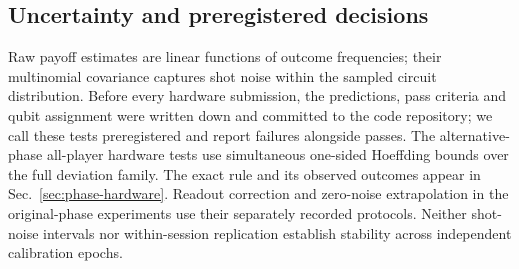 \subsection{Uncertainty and preregistered decisions}
Raw payoff estimates are linear functions of outcome frequencies; their
multinomial covariance captures shot noise within the sampled circuit
distribution. Before every hardware submission, the predictions, pass
criteria and qubit assignment were written down and committed to the code
repository; we call these tests preregistered and report failures alongside
passes. The alternative-phase all-player hardware tests use simultaneous
one-sided Hoeffding bounds over the full deviation family. The exact rule and
its observed outcomes appear in Sec.~\ref{sec:phase-hardware}. Readout
correction and zero-noise extrapolation in the original-phase experiments
use their separately recorded protocols. Neither shot-noise intervals nor within-session
replication establish stability across independent calibration epochs.


